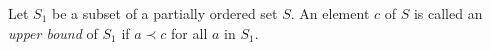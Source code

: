 Let $S_1$ be a subset of a partially ordered set $S$. An element $c$ of $S$ is called an \textit{upper bound} of $S_1$ if $a \prec c$ for all $a$ in $S_1$.
